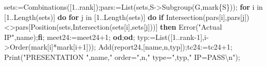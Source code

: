 \documentclass[
  10pt,
  letterpaper,
]{article}
\newenvironment{Shaded}{}{}
\newcommand{\BuiltInTok}[1]{\textcolor[rgb]{0.00,0.50,0.00}{#1}}
\newcommand{\ControlFlowTok}[1]{\textcolor[rgb]{0.00,0.44,0.13}{\textbf{#1}}}
\newcommand{\ExtensionTok}[1]{#1}
\newcommand{\FloatTok}[1]{\textcolor[rgb]{0.25,0.63,0.44}{#1}}
\newcommand{\NormalTok}[1]{#1}
\newcommand{\OperatorTok}[1]{\textcolor[rgb]{0.40,0.40,0.40}{#1}}
\newcommand{\StringTok}[1]{\textcolor[rgb]{0.25,0.44,0.63}{#1}}
\newcommand{\VariableTok}[1]{\textcolor[rgb]{0.10,0.09,0.49}{#1}}
\begin{document}
\begin{Shaded}
\begin{Highlighting}[]
 \VariableTok{sets}\OperatorTok{:=}\BuiltInTok{Combinations}\NormalTok{([}\FloatTok{1}\OperatorTok{..}\VariableTok{rank}\NormalTok{])}\OperatorTok{;}\VariableTok{pars}\OperatorTok{:=}\BuiltInTok{List}\NormalTok{(}\VariableTok{sets}\OperatorTok{,}\VariableTok{S}\OperatorTok{{-}\textgreater{}}\BuiltInTok{Subgroup}\NormalTok{(}\VariableTok{G}\OperatorTok{,}\VariableTok{mark}\NormalTok{\{}\VariableTok{S}\NormalTok{\}))}\OperatorTok{;}
 \ControlFlowTok{for} \VariableTok{i} \ExtensionTok{in}\NormalTok{ [}\FloatTok{1}\OperatorTok{..}\BuiltInTok{Length}\NormalTok{(}\VariableTok{sets}\NormalTok{)] }\ControlFlowTok{do} \ControlFlowTok{for} \VariableTok{j} \ExtensionTok{in}\NormalTok{ [}\FloatTok{1}\OperatorTok{..}\BuiltInTok{Length}\NormalTok{(}\VariableTok{sets}\NormalTok{)] }\ControlFlowTok{do}
  \ControlFlowTok{if} \BuiltInTok{Intersection}\NormalTok{(}\VariableTok{pars}\NormalTok{[}\VariableTok{i}\NormalTok{]}\OperatorTok{,}\VariableTok{pars}\NormalTok{[}\VariableTok{j}\NormalTok{])}\OperatorTok{\textless{}\textgreater{}}\VariableTok{pars}\NormalTok{[}\BuiltInTok{Position}\NormalTok{(}\VariableTok{sets}\OperatorTok{,}\BuiltInTok{Intersection}\NormalTok{(}\VariableTok{sets}\NormalTok{[}\VariableTok{i}\NormalTok{]}\OperatorTok{,}\VariableTok{sets}\NormalTok{[}\VariableTok{j}\NormalTok{]))] }\ControlFlowTok{then} \BuiltInTok{Error}\NormalTok{(}\StringTok{"Actual IP"}\OperatorTok{,}\VariableTok{name}\NormalTok{)}\OperatorTok{;}\ControlFlowTok{fi}\OperatorTok{;}
  \VariableTok{meet24}\OperatorTok{:=}\VariableTok{meet24}\OperatorTok{+}\FloatTok{1}\OperatorTok{;}
 \ControlFlowTok{od}\OperatorTok{;}\ControlFlowTok{od}\OperatorTok{;}
 \VariableTok{typ}\OperatorTok{:=}\BuiltInTok{List}\NormalTok{([}\FloatTok{1}\OperatorTok{..}\VariableTok{rank}\OperatorTok{{-}}\FloatTok{1}\NormalTok{]}\OperatorTok{,}\VariableTok{i}\OperatorTok{{-}\textgreater{}}\BuiltInTok{Order}\NormalTok{(}\VariableTok{mark}\NormalTok{[}\VariableTok{i}\NormalTok{]}\OperatorTok{*}\VariableTok{mark}\NormalTok{[}\VariableTok{i}\OperatorTok{+}\FloatTok{1}\NormalTok{]))}\OperatorTok{;}
 \BuiltInTok{Add}\NormalTok{(}\VariableTok{report24}\OperatorTok{,}\NormalTok{[}\VariableTok{name}\OperatorTok{,}\VariableTok{n}\OperatorTok{,}\VariableTok{typ}\NormalTok{])}\OperatorTok{;}\VariableTok{tc24}\OperatorTok{:=}\VariableTok{tc24}\OperatorTok{+}\FloatTok{1}\OperatorTok{;}
 \BuiltInTok{Print}\NormalTok{(}\StringTok{"PRESENTATION "}\OperatorTok{,}\VariableTok{name}\OperatorTok{,}\StringTok{" order="}\OperatorTok{,}\VariableTok{n}\OperatorTok{,}\StringTok{" type="}\OperatorTok{,}\VariableTok{typ}\OperatorTok{,}\StringTok{" IP=PASS\textbackslash{}n"}\NormalTok{)}\OperatorTok{;}

\end{Highlighting}
\end{Shaded}
\end{document}

